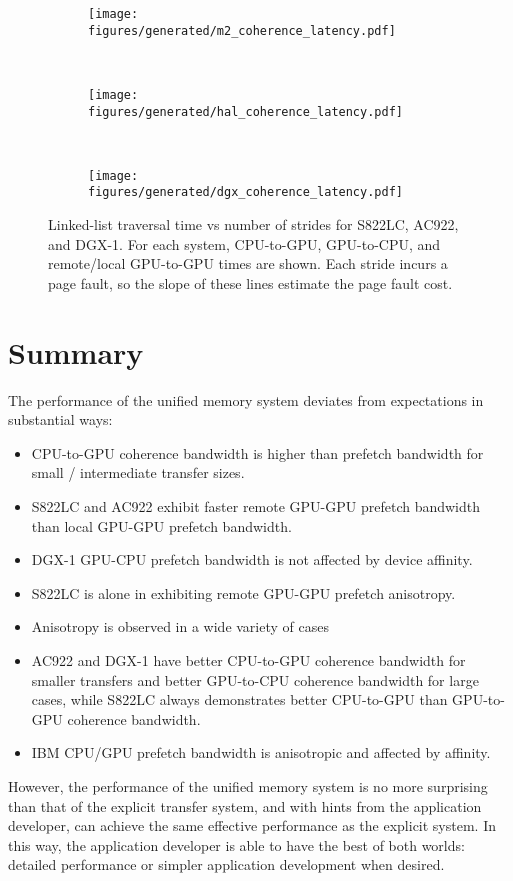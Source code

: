 \begin{figure}[ht]
	\centering
	\begin{subfigure}[b]{0.31\textwidth}
		\texttt{[image: figures/generated/m2\_coherence\_latency.pdf]}
		\caption{}
		\label{fig:s822lc-page-fault}
	\end{subfigure}
	~
	\begin{subfigure}[b]{0.31\textwidth}
		\texttt{[image: figures/generated/hal\_coherence\_latency.pdf]}
		\caption{}
		\label{fig:ac922-page-fault}
	\end{subfigure}
	~
	\begin{subfigure}[b]{0.31\textwidth}
		\texttt{[image: figures/generated/dgx\_coherence\_latency.pdf]}
		\caption{}
		\label{fig:dgx-page-fault}
	\end{subfigure}
	\caption[Page Fault Latencies for S822LC, AC922, and DGX-1]{
        Linked-list traversal time vs number of strides for S822LC, AC922, and DGX-1.
        For each system, CPU-to-GPU, GPU-to-CPU, and remote/local GPU-to-GPU times are shown.
        Each stride incurs a page fault, so the slope of these lines estimate the page fault cost.
    }
	\label{fig:coherence-page-fault-latency}
\end{figure}

\section{Summary}

The performance of the unified memory system deviates from expectations in substantial ways:
\begin{itemize}
\item CPU-to-GPU coherence bandwidth is higher than prefetch bandwidth for small / intermediate transfer sizes.
\item S822LC and AC922 exhibit faster remote GPU-GPU prefetch bandwidth than local GPU-GPU prefetch bandwidth.
\item DGX-1 GPU-CPU prefetch bandwidth is not affected by device affinity.
\item S822LC is alone in exhibiting remote GPU-GPU prefetch anisotropy.
\item Anisotropy is observed in a wide variety of cases
\item AC922 and DGX-1 have better CPU-to-GPU coherence bandwidth for smaller transfers and better GPU-to-CPU coherence bandwidth for large cases, while S822LC always demonstrates better CPU-to-GPU than GPU-to-GPU coherence bandwidth.
\item IBM CPU/GPU prefetch bandwidth is anisotropic and affected by affinity.
\end{itemize}
However, the performance of the unified memory system is no more surprising than that of the explicit transfer system, and with hints from the application developer, can achieve the same effective performance as the explicit system.
In this way, the application developer is able to have the best of both worlds: detailed performance or simpler application development when desired.